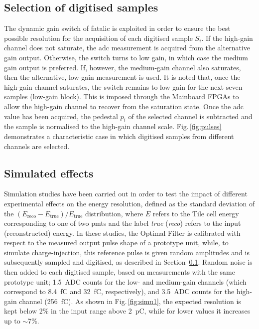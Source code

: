 \subsection{Selection of digitised samples}
\label{sec:samples}

The dynamic gain switch of \gls{fatalic} is exploited in order to ensure the best possible resolution for the acquisition of 
each digitised sample $S_i$. If the high-gain channel does not saturate, the \gls{adc} measurement is acquired from the alternative 
gain output. Otherwise, the switch turns to low gain, in which case the medium gain output is preferred. If, however, the medium-gain 
channel also saturates, then the alternative, low-gain measurement is used. It is noted that, once the high-gain channel saturates, 
the switch remains to low gain for the next seven samples (low-gain block). This is imposed through the Mainboard FPGAs to allow the 
high-gain channel to recover from the saturation state.
Once the \gls{adc} value has been acquired, the pedestal $p_i$ of the selected channel is subtracted and the sample is normalised to 
the high-gain channel scale. Fig.\,\ref{fig:pulses} demonstrates a characteristic case in which digitised samples from different
channels are selected.

\subsection{Simulated effects}
\label{sec:simeffects}

Simulation studies have been carried out in order to test the impact of different experimental effects on the energy resolution, 
defined as the standard deviation of the $(E_{\text{reco}}-E_{\text{true}})/E_{\text{true}}$ distribution, where $E$ refers to 
the Tile cell energy corresponding to one of two \glspl{pmt} and the label \textit{true} (\textit{reco}) refers to the input
(reconstructed) energy. In these studies, the Optimal Filter is calibrated with respect to the measured output pulse shape of a 
prototype unit, while, to simulate charge-injection, this reference pulse is given random amplitudes and is subsequently sampled 
and digitised, as described in Section~\ref{sec:samples}. Random noise is then added to each digitised sample, based on measurements 
with the same prototype unit; \SI{1.5}{ADC} counts for the low- and medium-gain channels (which correspond to \SI{8.4}{fC} and 
\SI{32}{fC}, respectively), and \SI{3.5}{ADC} counts for the high-gain channel (\SI{256}{fC}). As shown in Fig.\,\ref{fig:simu1}, 
the expected resolution is kept below 2\% in the input range above \SI{2}{pC}, while for lower values it increases up to $\sim$7\%.

